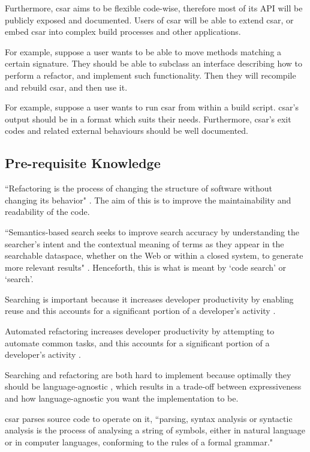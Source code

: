 \documentclass[12pt, letterpaper]{article}
\begin{document}
Furthermore, csar aims to be flexible code-wise, therefore most of its API will be publicly exposed and documented.
Users of csar will be able to extend csar, or embed csar into complex build processes and other applications.

For example, suppose a user wants to be able to move methods matching a certain signature.
They should be able to subclass an interface describing how to perform a refactor, and implement such functionality.
Then they will recompile and rebuild csar, and then use it.

For example, suppose a user wants to run csar from within a build script.
csar's output should be in a format which suits their needs.
Furthermore, csar's exit codes and related external behaviours should be well documented.

\subsection{Pre-requisite Knowledge}
``Refactoring is the process of changing the structure of software without changing its behavior" \autocite{murphy2012we}. The aim of this is to improve the maintainability and readability of the code.

``Semantics-based search seeks to improve search accuracy by understanding the searcher's intent and the contextual meaning of terms as they appear in the searchable dataspace, whether on the Web or within a closed system, to generate more relevant results" \autocite{wikipediasemanticsearch}.
Henceforth, this is what is meant by `code search' or `search'.

Searching is important because it increases developer productivity by enabling reuse and this accounts for a significant portion of a developer's activity \autocite{reiss2009semantics,stolee2014solving}.

Automated refactoring increases developer productivity by attempting to automate common tasks, and this accounts for a significant portion of a developer's activity \autocite{mens2004survey,murphy2012we}.

Searching and refactoring are both hard to implement because optimally they should be language-agnostic \autocite{mens2004survey,reiss2009semantics}, which results in a trade-off between expressiveness and how language-agnostic you want the implementation to be.

csar parses source code to operate on it, ``parsing, syntax analysis or syntactic analysis is the process of analysing a string of symbols, either in natural language or in computer languages, conforming to the rules of a formal grammar." \autocite{wikipediaparsing}
\end{document}
